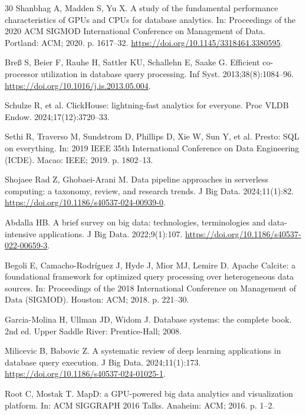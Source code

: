 \documentclass[10pt,a4paper]{article}
\begin{document}
{\begin{thebibliography}{30}
Shanbhag A, Madden S, Yu X. A study of the fundamental performance characteristics of GPUs and CPUs for database analytics. In: Proceedings of the 2020 ACM SIGMOD International Conference on Management of Data. Portland: ACM; 2020. p. 1617--32. \url{https://doi.org/10.1145/3318464.3380595}.

Bre{\ss} S, Beier F, Rauhe H, Sattler KU, Schallehn E, Saake G. Efficient co-processor utilization in database query processing. Inf Syst. 2013;38(8):1084--96. \url{https://doi.org/10.1016/j.is.2013.05.004}.

Schulze R, et al. ClickHouse: lightning-fast analytics for everyone. Proc VLDB Endow. 2024;17(12):3720--33.

Sethi R, Traverso M, Sundstrom D, Phillips D, Xie W, Sun Y, et al. Presto: SQL on everything. In: 2019 IEEE 35th International Conference on Data Engineering (ICDE). Macao: IEEE; 2019. p. 1802--13.

 Shojaee Rad Z, Ghobaei-Arani M. Data pipeline approaches in serverless computing: a taxonomy, review, and research trends. J Big Data. 2024;11(1):82. \url{https://doi.org/10.1186/s40537-024-00939-0}.

Abdalla HB. A brief survey on big data: technologies, terminologies and data-intensive applications. J Big Data. 2022;9(1):107. \url{https://doi.org/10.1186/s40537-022-00659-3}.

Begoli E, Camacho-Rodr{\'i}guez J, Hyde J, Mior MJ, Lemire D. Apache Calcite: a foundational framework for optimized query processing over heterogeneous data sources. In: Proceedings of the 2018 International Conference on Management of Data (SIGMOD). Houston: ACM; 2018. p. 221--30.

Garcia-Molina H, Ullman JD, Widom J. Database systems: the complete book. 2nd ed. Upper Saddle River: Prentice-Hall; 2008.

Milicevic B, Babovic Z. A systematic review of deep learning applications in database query execution. J Big Data. 2024;11(1):173. \url{https://doi.org/10.1186/s40537-024-01025-1}.

Root C, Mostak T. MapD: a GPU-powered big data analytics and visualization platform. In: ACM SIGGRAPH 2016 Talks. Anaheim: ACM; 2016. p. 1--2.


\end{thebibliography}}
\end{document}
